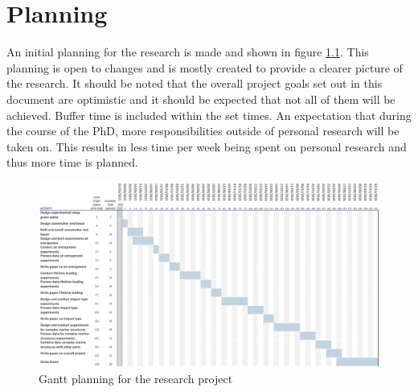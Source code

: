 \chapter{Planning}
\label{chap:planning}
An initial planning for the research is made and shown in figure \ref{fig:gantt_planning}. This planning is open to changes and is mostly created to provide a clearer picture of the research. It should be noted that the overall project goals set out in this document are optimistic and it should be expected that not all of them will be achieved. Buffer time is included within the set times. An expectation that during the course of the PhD, more responsibilities outside of personal research will be taken on. This results in less time per week being spent on personal research and thus more time is planned. 
\begin{figure}[]
	\centering
	\includegraphics[width=1.8\linewidth, angle =90]{figs/GanttPlanning.jpg}
	\caption{Gantt planning for the research project}
	\label{fig:gantt_planning}
\end{figure}

